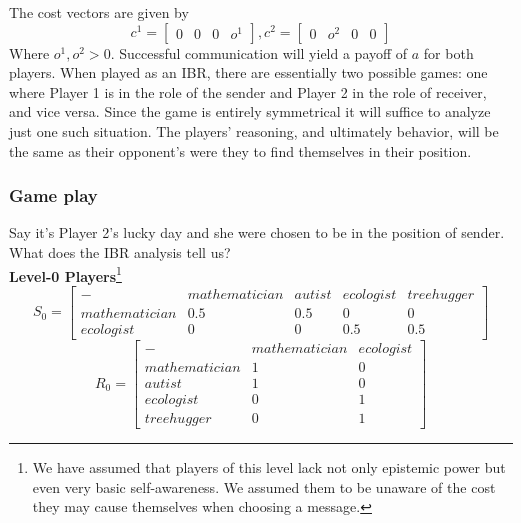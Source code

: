 \documentclass{article}
\begin{document}
The cost vectors are given by 
\begin{equation*}
c^1=
\begin{bmatrix}
0 & 0 & 0 & o^1
\end{bmatrix}
,
c^2=
\begin{bmatrix}
0 & o^2 & 0 & 0
\end{bmatrix}
\end{equation*}
Where $o^1,o^2>0$. Successful communication will yield a payoff of $a$ for both players. When played as an IBR, there are essentially two possible games: one where Player 1 is in the role of the sender and Player 2 in the role of receiver, and vice versa. Since the game is entirely symmetrical it will suffice to analyze just one such situation. The players' reasoning, and ultimately behavior, will be the same as their opponent's were they to find themselves in their position.

\subsubsection{Game play}
Say it's Player 2's lucky day and she were chosen to be in the position of sender.  What does the IBR analysis tell us?\\
\textbf{Level-0 Players}\footnote{We have assumed that players of this level lack not only epistemic power but even very basic self-awareness. We assumed them to be unaware of the cost they may cause themselves when choosing a message.}\\
\begin{equation*}
S_0=
\begin{bmatrix}
- & mathematician & autist & ecologist & treehugger \\
mathematician  & 0.5      & 0.5    & 0        & 0   \\
ecologist  & 0     & 0   & 0.5      & 0.5 
\end{bmatrix}
\end{equation*}
\begin{equation*}
R_0=
\begin{bmatrix}
- & mathematician & ecologist\\
mathematician  & 1      & 0 \\
autist  & 1     & 0   \\
ecologist & 0 & 1 \\
treehugger & 0 & 1
\end{bmatrix}
\end{equation*}
\end{document}
